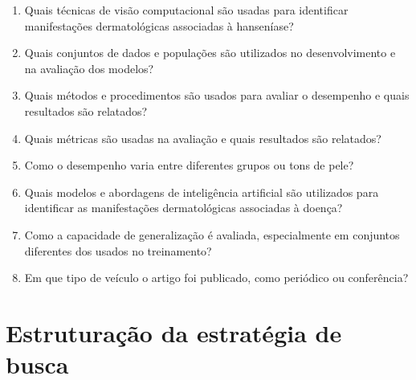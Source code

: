 \begin{enumerate}
\item Quais técnicas de visão computacional são usadas para identificar manifestações dermatológicas associadas à hanseníase?
\item Quais conjuntos de dados e populações são utilizados no desenvolvimento e na avaliação dos modelos?
\item Quais métodos e procedimentos são usados para avaliar o desempenho e quais resultados são relatados?
\item Quais métricas são usadas na avaliação e quais resultados são relatados?
\item Como o desempenho varia entre diferentes grupos ou tons de pele?
\item Quais modelos e abordagens de inteligência artificial são utilizados para identificar as manifestações dermatológicas associadas à doença?
\item Como a capacidade de generalização é avaliada, especialmente em conjuntos diferentes dos usados no treinamento?
\item Em que tipo de veículo o artigo foi publicado, como periódico ou conferência?
\end{enumerate}

\section{Estruturação da estratégia de busca}

